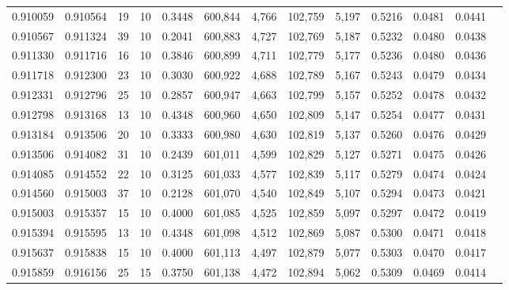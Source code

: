 \begin{tabular}{rrrrrrrrrrrrr}
0.910059 & 0.910564 &    19 &  10 &                                     0.3448 & 600,844 &   4,766 & 102,759 &   5,197 & 0.5216 & 0.0481 & 0.0441 \\
0.910567 & 0.911324 &    39 &  10 &                                     0.2041 & 600,883 &   4,727 & 102,769 &   5,187 & 0.5232 & 0.0480 & 0.0438 \\
0.911330 & 0.911716 &    16 &  10 &                                     0.3846 & 600,899 &   4,711 & 102,779 &   5,177 & 0.5236 & 0.0480 & 0.0436 \\
0.911718 & 0.912300 &    23 &  10 &                                     0.3030 & 600,922 &   4,688 & 102,789 &   5,167 & 0.5243 & 0.0479 & 0.0434 \\
0.912331 & 0.912796 &    25 &  10 &                                     0.2857 & 600,947 &   4,663 & 102,799 &   5,157 & 0.5252 & 0.0478 & 0.0432 \\
0.912798 & 0.913168 &    13 &  10 &                                     0.4348 & 600,960 &   4,650 & 102,809 &   5,147 & 0.5254 & 0.0477 & 0.0431 \\
0.913184 & 0.913506 &    20 &  10 &                                     0.3333 & 600,980 &   4,630 & 102,819 &   5,137 & 0.5260 & 0.0476 & 0.0429 \\
0.913506 & 0.914082 &    31 &  10 &                                     0.2439 & 601,011 &   4,599 & 102,829 &   5,127 & 0.5271 & 0.0475 & 0.0426 \\
0.914085 & 0.914552 &    22 &  10 &                                     0.3125 & 601,033 &   4,577 & 102,839 &   5,117 & 0.5279 & 0.0474 & 0.0424 \\
0.914560 & 0.915003 &    37 &  10 &                                     0.2128 & 601,070 &   4,540 & 102,849 &   5,107 & 0.5294 & 0.0473 & 0.0421 \\
0.915003 & 0.915357 &    15 &  10 &                                     0.4000 & 601,085 &   4,525 & 102,859 &   5,097 & 0.5297 & 0.0472 & 0.0419 \\
0.915394 & 0.915595 &    13 &  10 &                                     0.4348 & 601,098 &   4,512 & 102,869 &   5,087 & 0.5300 & 0.0471 & 0.0418 \\
0.915637 & 0.915838 &    15 &  10 &                                     0.4000 & 601,113 &   4,497 & 102,879 &   5,077 & 0.5303 & 0.0470 & 0.0417 \\
0.915859 & 0.916156 &    25 &  15 &                                     0.3750 & 601,138 &   4,472 & 102,894 &   5,062 & 0.5309 & 0.0469 & 0.0414 \\

\end{tabular}
